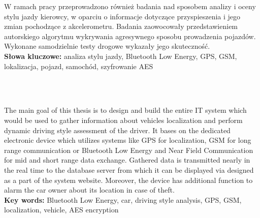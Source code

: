 \begin{singlespacing}
W ramach pracy przeprowadzono również badania nad sposobem analizy i oceny stylu jazdy kierowcy, w oparciu o informacje dotyczące przyspieszenia i jego zmian pochodzące z akcelerometru. Badania zaowocowały przedstawieniem autorskiego algorytmu wykrywania agresywnego sposobu prowadzenia pojazdów. Wykonane samodzielnie testy drogowe wykazały jego skuteczność. \\

\textbf{Słowa kluczowe: }analiza stylu jazdy, Bluetooth Low Energy, GPS, GSM, lokalizacja, pojazd, samochód, szyfrowanie AES

\end{singlespacing}

\cleardoublepage
\thispagestyle{empty}

\\


\\

\begin{singlespacing}


The main goal of this thesis is to design and build the entire IT system which would be used to gather information about vehicles localization and perform dynamic driving style assessment of the driver. It bases on the dedicated electronic device which utilizes systems like GPS for localization, GSM for long range communication or Bluetooth Low Energy and Near Field Communication for mid and short range data exchange. Gathered data is transmitted nearly in the real time to the database server from which it can be displayed via designed as a part of the system website. Moreover, the device has additional function to alarm the car owner about its location in case of theft.\\

\flushbottom
\textbf{Key words: }Bluetooth Low Energy, car, driving style analysis, GPS, GSM, localization, vehicle, AES encryption
\end{singlespacing}
